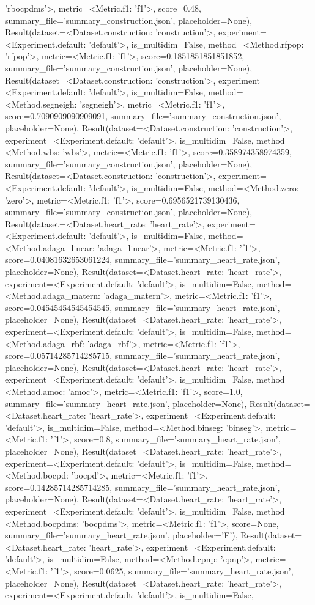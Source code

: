 'rbocpdms'>, metric=<Metric.f1: 'f1'>, score=0.48, summary_file='summary_construction.json', placeholder=None), Result(dataset=<Dataset.construction: 'construction'>, experiment=<Experiment.default: 'default'>, is_multidim=False, method=<Method.rfpop: 'rfpop'>, metric=<Metric.f1: 'f1'>, score=0.1851851851851852, summary_file='summary_construction.json', placeholder=None), Result(dataset=<Dataset.construction: 'construction'>, experiment=<Experiment.default: 'default'>, is_multidim=False, method=<Method.segneigh: 'segneigh'>, metric=<Metric.f1: 'f1'>, score=0.7090909090909091, summary_file='summary_construction.json', placeholder=None), Result(dataset=<Dataset.construction: 'construction'>, experiment=<Experiment.default: 'default'>, is_multidim=False, method=<Method.wbs: 'wbs'>, metric=<Metric.f1: 'f1'>, score=0.358974358974359, summary_file='summary_construction.json', placeholder=None), Result(dataset=<Dataset.construction: 'construction'>, experiment=<Experiment.default: 'default'>, is_multidim=False, method=<Method.zero: 'zero'>, metric=<Metric.f1: 'f1'>, score=0.6956521739130436, summary_file='summary_construction.json', placeholder=None), Result(dataset=<Dataset.heart_rate: 'heart_rate'>, experiment=<Experiment.default: 'default'>, is_multidim=False, method=<Method.adaga_linear: 'adaga_linear'>, metric=<Metric.f1: 'f1'>, score=0.04081632653061224, summary_file='summary_heart_rate.json', placeholder=None), Result(dataset=<Dataset.heart_rate: 'heart_rate'>, experiment=<Experiment.default: 'default'>, is_multidim=False, method=<Method.adaga_matern: 'adaga_matern'>, metric=<Metric.f1: 'f1'>, score=0.04545454545454545, summary_file='summary_heart_rate.json', placeholder=None), Result(dataset=<Dataset.heart_rate: 'heart_rate'>, experiment=<Experiment.default: 'default'>, is_multidim=False, method=<Method.adaga_rbf: 'adaga_rbf'>, metric=<Metric.f1: 'f1'>, score=0.05714285714285715, summary_file='summary_heart_rate.json', placeholder=None), Result(dataset=<Dataset.heart_rate: 'heart_rate'>, experiment=<Experiment.default: 'default'>, is_multidim=False, method=<Method.amoc: 'amoc'>, metric=<Metric.f1: 'f1'>, score=1.0, summary_file='summary_heart_rate.json', placeholder=None), Result(dataset=<Dataset.heart_rate: 'heart_rate'>, experiment=<Experiment.default: 'default'>, is_multidim=False, method=<Method.binseg: 'binseg'>, metric=<Metric.f1: 'f1'>, score=0.8, summary_file='summary_heart_rate.json', placeholder=None), Result(dataset=<Dataset.heart_rate: 'heart_rate'>, experiment=<Experiment.default: 'default'>, is_multidim=False, method=<Method.bocpd: 'bocpd'>, metric=<Metric.f1: 'f1'>, score=0.14285714285714285, summary_file='summary_heart_rate.json', placeholder=None), Result(dataset=<Dataset.heart_rate: 'heart_rate'>, experiment=<Experiment.default: 'default'>, is_multidim=False, method=<Method.bocpdms: 'bocpdms'>, metric=<Metric.f1: 'f1'>, score=None, summary_file='summary_heart_rate.json', placeholder='F'), Result(dataset=<Dataset.heart_rate: 'heart_rate'>, experiment=<Experiment.default: 'default'>, is_multidim=False, method=<Method.cpnp: 'cpnp'>, metric=<Metric.f1: 'f1'>, score=0.0625, summary_file='summary_heart_rate.json', placeholder=None), Result(dataset=<Dataset.heart_rate: 'heart_rate'>, experiment=<Experiment.default: 'default'>, is_multidim=False, 
